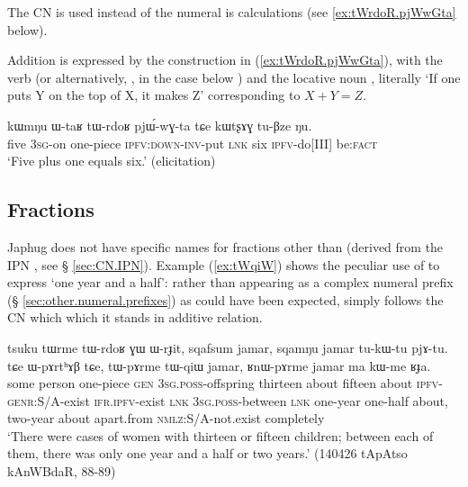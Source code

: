 The CN  is used instead of the numeral  is calculations (see \ref{ex:tWrdoR.pjWwGta} below).

Addition is expressed by the construction in (\ref{ex:tWrdoR.pjWwGta}), with the verb  (or alternatively, , in the case below ) and the locative noun , literally  `If one puts Y on the top of X, it makes Z' corresponding to $X+Y=Z$.  

\begin{exe}
\ex \label{ex:tWrdoR.pjWwGta}
 \gll kɯmŋu ɯ-taʁ tɯ-rdoʁ pjɯ́-wɣ-ta tɕe kɯtʂɤɣ tu-βze ŋu.  \\
 five \textsc{3sg}-on one-piece \textsc{ipfv}:\textsc{down}-\textsc{inv}-put \textsc{lnk} six \textsc{ipfv}-do[III] be:\textsc{fact} \\
 \glt `Five plus one equals six.' (elicitation)
\end{exe}

\subsection{Fractions} \label{sec:fractions}
Japhug does not have specific names for fractions other than  (derived from the IPN , see § \ref{sec:CN.IPN}). Example (\ref{ex:tWqiW}) shows the peculiar use of  to express `one year and a half': rather than appearing as a complex numeral prefix (§ \ref{sec:other.numeral.prefixes}) as could have been expected,    simply follows the CN  which which it stands in additive relation.

\begin{exe}
\ex \label{ex:tWqiW}
 \gll tsuku tɯrme tɯ-rdoʁ ɣɯ ɯ-rɟit, sqafsum jamar, sqamŋu jamar tu-kɯ-tu pjɤ-tu. tɕe ɯ-pɤrtʰɤβ tɕe, tɯ-pɤrme tɯ-qiɯ jamar, ʁnɯ-pɤrme jamar ma kɯ-me ʁɟa. \\
 some person one-piece \textsc{gen} \textsc{3sg}.\textsc{poss}-offspring thirteen about fifteen about \textsc{ipfv}-\textsc{genr}:S/A-exist \textsc{ifr}.\textsc{ipfv}-exist  \textsc{lnk} \textsc{3sg}.\textsc{poss}-between \textsc{lnk} one-year one-half about, two-year about apart.from \textsc{nmlz}:S/A-not.exist completely  \\
 \glt  `There were cases of women with thirteen or fifteen children; between each of them, there was only one year and a half or two years.' (140426 tApAtso kAnWBdaR, 88-89)
\end{exe}

